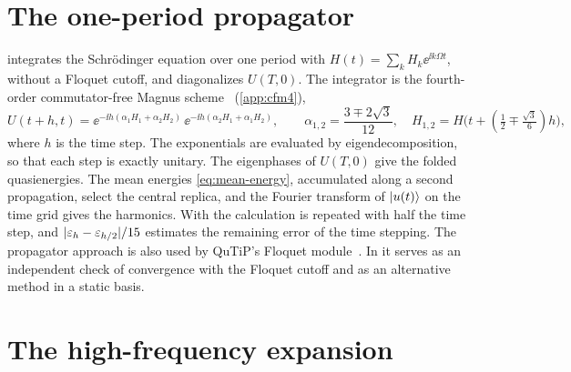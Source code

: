 \section{The one-period propagator}\label{sec:propagator}

 integrates the Schr\"odinger equation over one period with
$H(t)=\sum_kH_k\ee^{\ii k\Omega t}$, without a Floquet cutoff, and diagonalizes $U(T,0)$. The
integrator is the fourth-order commutator-free Magnus
scheme~\cite{blanes2006fourth,alvermann2011high,blanes2009magnus} (\cref{app:cfm4}),
\begin{equation}\label{eq:cfm4}
  U(t+h,t)=\ee^{-\ii h(\alpha_1H_1+\alpha_2H_2)}\,\ee^{-\ii h(\alpha_2H_1+\alpha_1H_2)},\qquad
  \alpha_{1,2}=\frac{3\mp2\sqrt3}{12},\quad H_{1,2}=H\bigl(t+(\tfrac12\mp\tfrac{\sqrt3}6)h\bigr),
\end{equation}
where $h$ is the time step. The exponentials are evaluated by eigendecomposition, so that
each step is exactly unitary. The eigenphases of $U(T,0)$ give the folded quasienergies. The
mean energies \eqref{eq:mean-energy}, accumulated along a second propagation, select the
central replica, and the Fourier transform of $\lvert u(t)\rangle$ on the time grid gives the
harmonics. With  the calculation is repeated with half the time step,
and $\lvert \varepsilon_h-\varepsilon_{h/2}\rvert/15$ estimates the remaining error of the time stepping. The
propagator approach is also used by QuTiP's Floquet
module~\cite{johansson2012qutip,lambert2026qutip}. In \pkg{} it serves as an independent
check of convergence with the Floquet cutoff and as an alternative method in a static basis.

\section{The high-frequency expansion}\label{sec:van-vleck}


